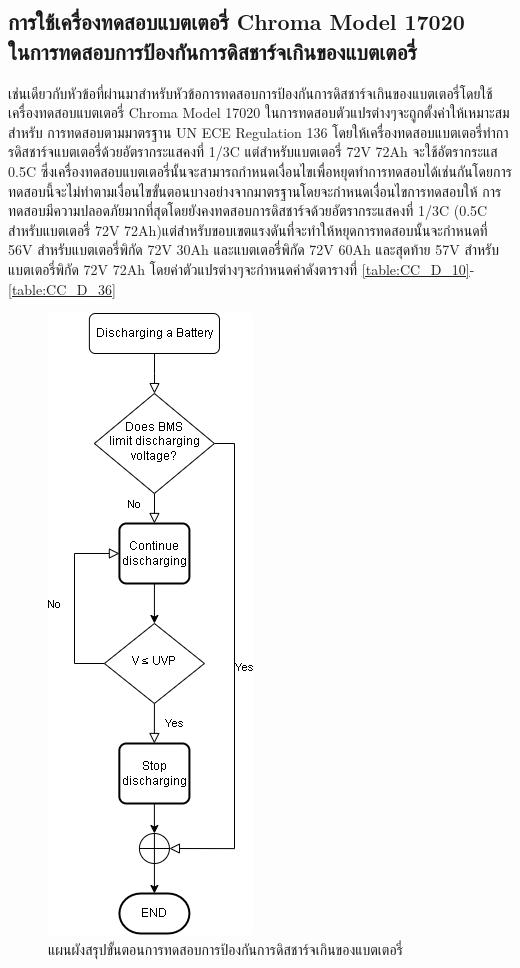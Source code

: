 \subsection{การใช้เครื่องทดสอบแบตเตอรี่ Chroma Model 17020 \\ ในการทดสอบการป้องกันการดิสชาร์จเกินของแบตเตอรี่}
เช่นเดียวกับหัวข้อที่ผ่านมาสำหรับหัวข้อการทดสอบการป้องกันการดิสชาร์จเกินของแบตเตอรี่โดยใช้เครื่องทดสอบแบตเตอรี่ Chroma Model 17020 ในการทดสอบตัวแปรต่างๆจะถูกตั้งค่าให้เหมาะสมสำหรับ
การทดสอบตามมาตรฐาน UN ECE Regulation 136 โดยให้เครื่องทดสอบแบตเตอรี่ทำการดิสชาร์จแบตเตอรี่ด้วยอัตรากระแสคงที่ 1/3C แต่สำหรับแบตเตอรี่ 72V 72Ah จะใช้อัตรากระแส 0.5C ซึ่งเครื่องทดสอบแบตเตอรี่นั้นจะสามารถกำหนดเงื่อนไขเพื่อหยุดทำการทดสอบได้เช่นกันโดยการทดสอบนี้จะไม่ทำตามเงื่อนไขขั้นตอนบางอย่างจากมาตรฐานโดยจะกำหนดเงื่อนไขการทดสอบให้
การทดสอบมีความปลอดภัยมากที่สุดโดยยังคงทดสอบการดิสชาร์จด้วยอัตรากระแสคงที่ 1/3C (0.5C สำหรับแบตเตอรี่ 72V 72Ah)แต่สำหรับขอบเขตแรงดันที่จะทำให้หยุดการทดสอบนั้นจะกำหนดที่ 
56V สำหรับแบตเตอรี่พิกัด 72V 30Ah และแบตเตอรี่พิกัด 72V 60Ah และสุดท้าย 57V สำหรับแบตเตอรี่พิกัด 72V 72Ah โดยค่าตัวแปรต่างๆจะกำหนดค่าดังตารางที่
\ref{table:CC_D_10}-\ref{table:CC_D_36}
\begin{center}
	\begin{figure}[H]
		\includegraphics[width=0.25\linewidth]{Chapters/img/R136_DEMO/Discharging_flow_chart.png}
		\centering
		\captionsetup{justification=centering,margin=2cm}
		\caption{แผนผังสรุปขั้นตอนการทดสอบการป้องกันการดิสชาร์จเกินของแบตเตอรี่}
	\end{figure}
\end{center}
